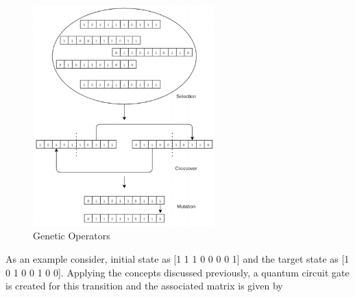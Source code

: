 \documentclass[conference]{IEEEtran}
\begin{document}
\begin{figure}[!t]
\centering\includegraphics[width=7cm]{p2.png}
\caption{Genetic Operators}
\label{p3}
\end{figure}
As an example consider, initial state as [1 1 1 0 0 0 0 1] and the target state as [1 0 1 0 0 1 0 0]. Applying the concepts discussed previously, a quantum circuit gate is created for this transition and the associated matrix is given by 
\end{document}
